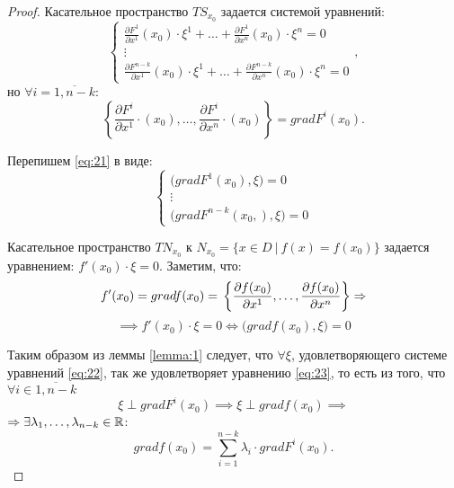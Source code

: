 \begin{proof}
    Касательное пространство $TS_{x_0}$ задается системой уравнений:
    \begin{equation}\label{eq:21}
        \left\{\begin{array}{l}
            \frac{\partial F^1}{\partial x^1}(x_0)\cdot \xi^1 + \ldots + \frac{\partial F^1}{\partial x^n}(x_0) \cdot \xi^n = 0 \\
            \vdots                                                                                                      \\
            \frac{\partial F^{n-k}}{\partial x^1}(x_0)\cdot \xi^1 + \ldots + \frac{\partial F^{n-k}}{\partial x^n}(x_0) \cdot \xi^n = 0
        \end{array}\right.,
    \end{equation}
    но $\forall i = \overline{1,n-k}:$
    \[
        \left\{\frac{\partial F^i}{\partial x^1}\cdot (x_0),\ldots,\frac{\partial F^i}{\partial x^n}\cdot (x_0)\right\} = grad F^i(x_0).
    \]

    Перепишем \ref{eq:21} в виде:
    \begin{equation}\label{eq:22}
        \left\{\begin{array}{l}
            \big(grad F^1(x_0),\xi\big) = 0 \\
            \vdots                          \\
            \big(grad F^{n-k}(x_0,),\xi\big) = 0
        \end{array}\right.
    \end{equation}

    Касательное пространство $TN_{x_0}$ к $N_{x_0} = \big\{x \in D \ \big| \ f(x) = f(x_0)\big\}$ задается уравнением: $f'(x_0)\cdot\xi = 0$. Заметим, что:
    \[
        f'(x_0) = grad f(x_0) = \\ \left\{\frac{\partial f(x_0)}{\partial x^1},\ldots,\frac{\partial f(x_0)}{\partial x^n}\right\} \implies
    \]
    \begin{equation}\label{eq:23}
        \implies f'(x_0)\cdot \xi = 0 \iff \big(grad f(x_0),\xi\big) = 0
    \end{equation}

    Таким образом из леммы \ref{lemma:1} следует, что $\forall \xi$, удовлетворяющего системе уравнений \ref{eq:22}, так же удовлетворяет уравнению \ref{eq:23}, то есть из того, что $\forall i \in \overline{1,n-k}$
    \[
        \xi \perp grad F^i(x_0) \implies \xi \perp grad f(x_0) \implies
    \]
    $ \implies \exists \lambda_1,\ldots,\lambda_{n-k} \in \R $:
    \[
        grad f(x_0) = \sum_{i = 1}^{n-k} \lambda_i\cdot grad F^i(x_0).
    \]
\end{proof}


